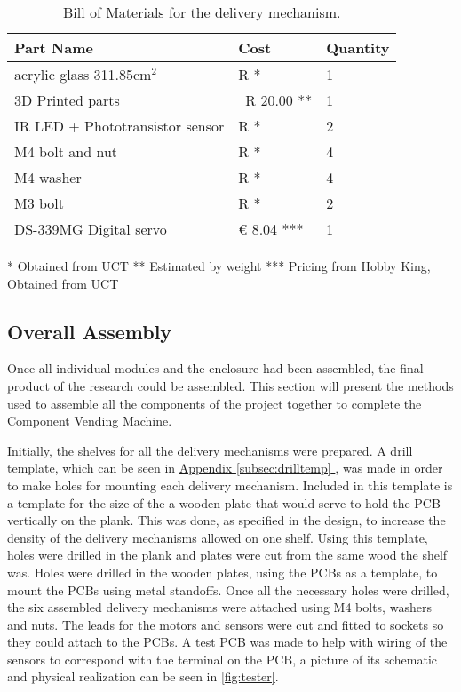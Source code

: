 \documentclass[a4paper,11pt]{article}
\newcommand*{\fullref}[1]{\hyperref[{#1}]{\Appendixautorefname  \ref*{#1} \nameref*{#1}}}
\newcommand*{\Appendixautorefname}{Appendix }
\numberwithin{figure}{section}
\numberwithin{table}{section}
\begin{document}
	\begin{table}[ht]
	\centering		
	\begin{tabular}{| m{8cm} | m{4cm}| m{3cm} |}
	\hline
	\textbf{Part Name} & \textbf{Cost} & \textbf{Quantity} \\
	\hline
	acrylic glass 311.85cm$^2$ & R * & 1 \\
	\hline
	3D Printed parts & ~R 20.00 ** & 1 \\
	\hline
	IR LED + Phototransistor sensor & R * & 2 \\
	\hline
	M4 bolt and nut & R * & 4 \\
	\hline 
	M4 washer & R * & 4 \\
	\hline	
	M3 bolt & R * & 2 \\
	\hline
	DS-339MG Digital servo & \euro{} 8.04 *** & 1 \\
	\hline
	\end{tabular}
	
	 * Obtained from UCT
	 ** Estimated by weight
	 *** Pricing from Hobby King, Obtained from UCT
	\caption{Bill of Materials for the delivery mechanism. \label{tab:bomdel}}
	\end{table}	

\subsection{Overall Assembly}
\label{subsec:finbuild}
Once all individual modules and the enclosure had been assembled, the final product of the research could be assembled. This section will present the methods used to assemble all the components of the project together to complete the Component Vending Machine.

Initially, the shelves for all the delivery mechanisms were prepared. A drill template, which can be seen in \fullref{subsec:drilltemp}, was made in order to make holes for mounting each delivery mechanism. Included in this template is a template for the size of the a wooden plate that would serve to hold the PCB vertically on the plank. This was done, as specified in the design, to increase the density of the delivery mechanisms allowed on one shelf. Using this template, holes were drilled in the plank and plates were cut from the same wood the shelf was. Holes were drilled in the wooden plates, using the PCBs as a template, to mount the PCBs using metal standoffs. Once all the necessary holes were drilled, the six assembled delivery mechanisms were attached using M4 bolts, washers and nuts. The leads for the motors and sensors were cut and fitted to sockets so they could attach to the PCBs. A test PCB was made to help with wiring of the sensors to correspond with the terminal on the PCB, a picture of its schematic and physical realization can be seen in \autoref{fig:tester}.
\end{document}
